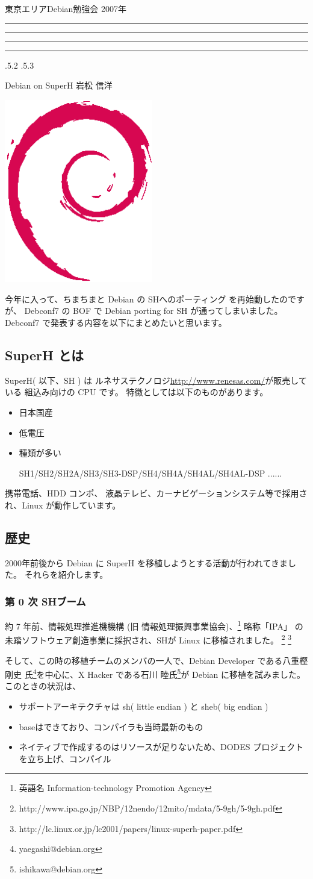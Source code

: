 \documentclass[mingoth,a4paper]{jsarticle}
\makeatletter
\newcommand{\debmtgyear}{2007}
\renewcommand{\section}{\@startsection{section}{1}{\z@}%
    {\Cvs \@plus.5\Cdp \@minus.2\Cdp}%
    {.5\Cvs \@plus.3\Cdp}%
    {\normalfont\Huge\headfont\raggedright\centering}} %
\newcommand{\dancersection}[2]{%
\newpage
東京エリアDebian勉強会 \debmtgyear{}年
\hrule
\vspace{0.5mm}
\hrule
%
\vspace{4cm}
\hrule
\vspace{0.5mm}
\hrule
%
\vspace{-7cm}
\begin{minipage}[b]{0.7\hsize}
\section{#1}
\hfill{}#2\\
\vspace{2cm}
\end{minipage}
\begin{minipage}[b]{0.3\hsize}
\hfill{}\includegraphics[height=8cm]{image200502/openlogo-nd.eps}\\
\end{minipage}
%
\vspace{-1cm}
}
\makeatother
\begin{document}
\dancersection{Debian on SuperH}{岩松 信洋}
\label{debiansuperh}

今年に入って、ちまちまと Debian の SHへのポーティング を再始動したのですが、
Debconf7 の BOF で Debian porting for SH が通ってしまいました。
Debconf7 で発表する内容を以下にまとめたいと思います。

\subsection{SuperH とは}

SuperH( 以下、SH ) は ルネサステクノロジ\url{http://www.renesas.com/}が販売している 組込み向けの CPU です。
特徴としては以下のものがあります。
\begin{itemize}
	\item 日本国産
	\item 低電圧
	\item 種類が多い

		SH1/SH2/SH2A/SH3/SH3-DSP/SH4/SH4A/SH4AL/SH4AL-DSP ......
\end{itemize}

携帯電話、HDD コンポ、 液晶テレビ、カーナビゲーションシステム等で採用され、Linux が動作しています。

\subsection{歴史}

2000年前後から Debian に SuperH を移植しようとする活動が行われてきました。
それらを紹介します。

\subsubsection{第 0 次 SHブーム}
約 7 年前、情報処理推進機機構 (旧 情報処理振興事業協会)、\footnote{英語名 Information-technology Promotion Agency} 略称「IPA」
の未踏ソフトウェア創造事業に採択され、SHが Linux に移植されました。
\footnote{http://www.ipa.go.jp/NBP/12nendo/12mito/mdata/5-9gh/5-9gh.pdf}
\footnote{http://lc.linux.or.jp/lc2001/papers/linux-superh-paper.pdf}

そして、この時の移植チームのメンバの一人で、Debian Developer である八重樫 剛史 氏\footnote{yaegashi@debian.org}を中心に、X Hacker
である石川 睦氏\footnote{ishikawa@debian.org}が Debian に移植を試みました。
このときの状況は、

\begin{itemize}
 \item サポートアーキテクチャは sh( little endian ) と sheb( big endian )
 \item baseはできており、コンパイラも当時最新のもの
 \item ネイティブで作成するのはリソースが足りないため、DODES プロジェクトを立ち上げ、コンパイル
\end{itemize}
\end{document}
